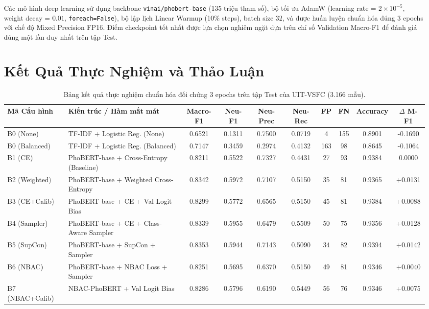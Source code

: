 \documentclass[10pt,journal,compsoc]{IEEEtran}
\begin{document}
Các mô hình deep learning sử dụng backbone \texttt{vinai/phobert-base} (135 triệu tham số), bộ tối ưu AdamW (learning rate = $2\times 10^{-5}$, weight decay = $0.01$, \texttt{foreach=False}), bộ lập lịch Linear Warmup (10\% steps), batch size 32, và được huấn luyện chuẩn hóa đúng 3 epochs với chế độ Mixed Precision FP16. Điểm checkpoint tốt nhất được lựa chọn nghiêm ngặt dựa trên chỉ số Validation Macro-F1 để đánh giá đúng một lần duy nhất trên tập Test.

\section{Kết Quả Thực Nghiệm và Thảo Luận}

\begin{table}[t]
\centering
\caption{Bảng kết quả thực nghiệm chuẩn hóa đối chứng 3 epochs trên tập Test của UIT-VSFC (3.166 mẫu).}
\label{tab:benchmark}
\begin{tabular}{llcccccccc}
\toprule
\textbf{Mã Cấu hình} & \textbf{Kiến trúc / Hàm mất mát} & \textbf{Macro-F1} & \textbf{Neu-F1} & \textbf{Neu-Prec} & \textbf{Neu-Rec} & \textbf{FP} & \textbf{FN} & \textbf{Accuracy} & \textbf{$\Delta$ M-F1} \\
\midrule
B0 (None) & TF-IDF + Logistic Reg. (None) & 0.6521 & 0.1311 & 0.7500 & 0.0719 & 4 & 155 & 0.8901 & -0.1690 \\
B0 (Balanced) & TF-IDF + Logistic Reg. (Balanced) & 0.7147 & 0.3459 & 0.2974 & 0.4132 & 163 & 98 & 0.8645 & -0.1064 \\
B1 (CE) & PhoBERT-base + Cross-Entropy (Baseline) & 0.8211 & 0.5522 & 0.7327 & 0.4431 & 27 & 93 & 0.9384 & 0.0000 \\
B2 (Weighted) & PhoBERT-base + Weighted Cross-Entropy & 0.8342 & 0.5972 & 0.7107 & 0.5150 & 35 & 81 & 0.9365 & +0.0131 \\
B3 (CE+Calib) & PhoBERT-base + CE + Val Logit Bias & 0.8299 & 0.5772 & 0.6565 & 0.5150 & 45 & 81 & 0.9384 & +0.0088 \\
B4 (Sampler) & PhoBERT-base + CE + Class-Aware Sampler & 0.8339 & 0.5955 & 0.6479 & 0.5509 & 50 & 75 & 0.9356 & +0.0128 \\
B5 (SupCon) & PhoBERT-base + SupCon + Sampler & 0.8353 & 0.5944 & 0.7143 & 0.5090 & 34 & 82 & 0.9394 & +0.0142 \\
B6 (NBAC) & PhoBERT-base + NBAC Loss + Sampler & 0.8251 & 0.5695 & 0.6370 & 0.5150 & 49 & 81 & 0.9346 & +0.0040 \\
B7 (NBAC+Calib) & NBAC-PhoBERT + Val Logit Bias & 0.8286 & 0.5796 & 0.6190 & 0.5449 & 56 & 76 & 0.9346 & +0.0075 \\

\end{tabular}
\end{table}
\end{document}

